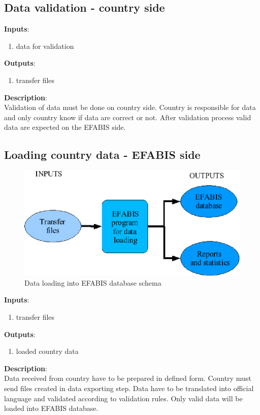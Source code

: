 \subsection{Data validation - country side}
\label{sub:validdata}
\textbf{Inputs}:
\begin{enumerate}
\item data for validation
\end{enumerate}
\textbf{Outputs}:
\begin{enumerate}
\item transfer files
\end{enumerate}
\textbf{Description}:\\
Validation of data must be done on country side. Country is responsible for data and only country know if data are correct or not. After validation process valid data are expected on the EFABIS side.


\subsection{Loading country data - EFABIS side}
\label{sub:loaddata}
\begin{figure}[h]
\vspace{1cm}
   \centering
   \includegraphics{./loading_from_other_db/schema4b.eps}
   \caption{Data loading into EFABIS database schema}
   \label{fig:schema4}\vspace{1cm}
\end{figure}
\textbf{Inputs}:
\begin{enumerate}
\item transfer files
\end{enumerate}
\textbf{Outputs}:
\begin{enumerate}
\item loaded country data
\end{enumerate}
\textbf{Description}:\\
Data received from country have to be prepared in defined form. Country must send files created in data exporting step. Data have to be translated into official language and validated according to validation rules. Only valid data will be loaded into EFABIS database.


